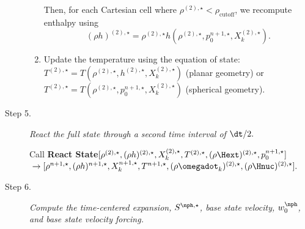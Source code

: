\begin{description}
\begin{enumerate}
\begin{enumerate}
\end{enumerate}

Then, for each Cartesian cell where $\rho^{(2),\star} < \rho_\mathrm{cutoff}$,
we recompute enthalpy using
\begin{equation}
(\rho h)^{(2),\star} = \rho^{(2),\star}h\left(\rho^{(2),\star},p_0^{n+1,\star},X_k^{(2),\star}\right).
\end{equation}

\item Update the temperature using the equation of state:
$T^{(2),\star} = 
  T(\rho^{(2),\star}, h^{(2),\star}, X_k^{(2),\star})$ (planar geometry) or
$T^{(2),\star} = 
  T(\rho^{(2),\star}, p_0^{n+1,\star}, X_k^{(2),\star})$ (spherical geometry).
\end{enumerate}

\item[Step 5.] {\em React the full state through a second time interval of $\dt / 2.$}

Call {\bf React State}$[ \rho^{(2),\star},(\rho h)^{(2),\star}, X_k^{(2),\star}, T^{(2),\star}, 
(\rho\Hext)^{(2),\star}, p_0^{n+1,\star}]$ \\
 ${}\hfill   \rightarrow [ \rho^{n+1,\star},(\rho h)^{n+1,\star}, X_k^{n+1,\star}, T^{n+1,\star}, (\rho \omegadot_k)^{(2),\star}, (\rho \Hnuc)^{(2),\star} ].$

\item[Step 6.] {\em Compute the time-centered expansion, $S^{\nph,\star}$, base state
velocity, $w_0^{\nph}$, and base state velocity forcing.}

\begin{enumerate}
\renewcommand{\theenumi}{{\bf \Alph{enumi}}}


\end{enumerate}
\end{description}
